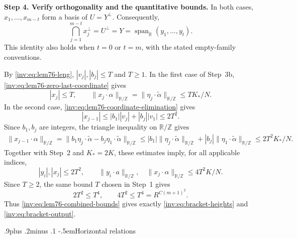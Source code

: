 \documentclass[twoside]{aomart}
\makeatletter
\theoremstyle{paperplain}
\theoremstyle{paperdefinition}
\renewcommand\subsection{\@startsection{subsection}{2}{\z@}
  {.9\baselineskip plus .2\baselineskip minus .1\baselineskip}
  {-.5em}{\normalfont\bfseries}}
\renewenvironment{proof}[1][\proofname]{\par\pushQED{\qed}%
  \normalfont\topsep6\p@\@plus3\p@\relax\trivlist
  \item[\hskip\labelsep\itshape #1\@addpunct{.}]\ignorespaces
}{\popQED\endtrivlist\@endpefalse}
\numberwithin{equation}{section}
\makeatother
\begin{document}
\begin{proof}
\par
\medskip
\noindent\textbf{Step 4. Verify orthogonality and the quantitative bounds.}
In both cases, $x_1,\ldots,x_{m-t}$ form a basis of $U=Y^\perp$.
Consequently,
\begin{equation*}
 \bigcap_{j=1}^{m-t}x_j^\perp
 =U^\perp=Y=\operatorname{span}_{\mathbb R}(y_1,\ldots,y_t).
\end{equation*}
This identity also holds when $t=0$ or $t=m$, with the stated empty-family
conventions.

By \eqref{inv:eq:lem76-leng}, $|v_j|,|b_j|\le T$ and $T\ge1$.
In the first case of Step~3b, \eqref{inv:eq:lem76-zero-last-coordinate}
gives
\begin{equation*}
 |x_j|\le T,\qquad
 \|x_j\cdot\alpha\|_{\mathbb R/\mathbb Z}
 =\|\eta_j\cdot\widetilde\alpha\|_{\mathbb R/\mathbb Z}
 \le TK_*/N.
\end{equation*}
In the second case, \eqref{inv:eq:lem76-coordinate-elimination} gives
\begin{equation*}
 |x_{j-1}|\le |b_1||v_j|+|b_j||v_1|\le2T^2.
\end{equation*}
Since $b_1,b_j$ are integers, the triangle inequality on
$\mathbb R/\mathbb Z$ gives
\begin{equation*}
 \begin{aligned}
 \|x_{j-1}\cdot\alpha\|_{\mathbb R/\mathbb Z}
 =\|b_1\eta_j\cdot\widetilde\alpha
       -b_j\eta_1\cdot\widetilde\alpha\|_{\mathbb R/\mathbb Z}
 \le |b_1|\|\eta_j\cdot\widetilde\alpha\|_{\mathbb R/\mathbb Z}
       +|b_j|\|\eta_1\cdot\widetilde\alpha\|_{\mathbb R/\mathbb Z}
 \le2T^2K_*/N.
 \end{aligned}
\end{equation*}
Together with Step~2 and $K_*=2K$, these estimates imply, for all
applicable indices,
\begin{equation}
 |y_i|,|x_j|\le2T^2,\qquad
 \|y_i\cdot a\|_{\mathbb R/\mathbb Z},\quad
 \|x_j\cdot\alpha\|_{\mathbb R/\mathbb Z}\le4T^2K/N.
 \label{inv:eq:lem76-combined-bounds}
\end{equation}
Since $T\ge2$, the same bound $T$ chosen in Step~1 gives
\begin{equation*}
 2T^2\le T^4,\qquad 4T^2\le T^4
   =R^{C(m+1)^2}.
\end{equation*}
Thus \eqref{inv:eq:lem76-combined-bounds} gives exactly
\eqref{inv:eq:bracket-heights} and \eqref{inv:eq:bracket-output}.
\end{proof}

\subsection{Horizontal relations}
\end{document}
